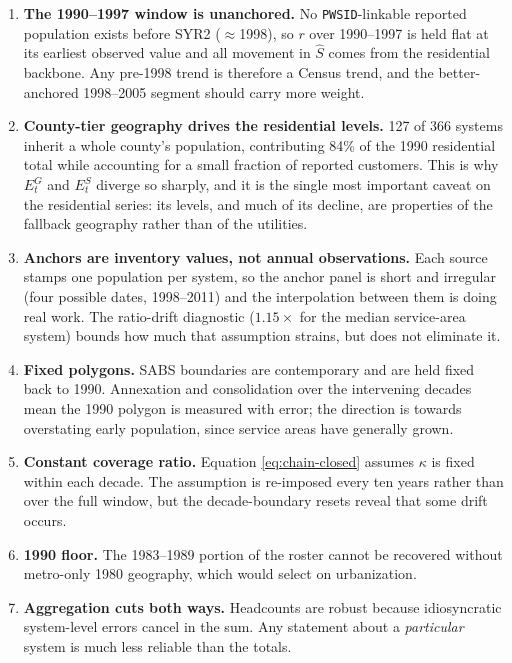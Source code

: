 \begin{enumerate}
  \item \textbf{The 1990--1997 window is unanchored.} No \texttt{PWSID}-linkable
    reported population exists before SYR2 ($\approx$1998), so $r$ over
    1990--1997 is held flat at its earliest observed value and all movement in
    $\hat S$ comes from the residential backbone. Any pre-1998 trend is therefore
    a Census trend, and the better-anchored 1998--2005 segment should carry more
    weight.
  \item \textbf{County-tier geography drives the residential levels.} 127 of 366
    systems inherit a whole county's population, contributing 84\% of the 1990
    residential total while accounting for a small fraction of reported
    customers. This is why $E^{G}_t$ and $E^{S}_t$ diverge so sharply, and it is
    the single most important caveat on the residential series: its levels, and
    much of its decline, are properties of the fallback geography rather than of
    the utilities.
  \item \textbf{Anchors are inventory values, not annual observations.} Each
    source stamps one population per system, so the anchor panel is short and
    irregular (four possible dates, 1998--2011) and the interpolation between
    them is doing real work. The ratio-drift diagnostic ($1.15\times$ for the
    median service-area system) bounds how much that assumption strains, but does
    not eliminate it.
  \item \textbf{Fixed polygons.} SABS boundaries are contemporary and are held
    fixed back to 1990. Annexation and consolidation over the intervening decades
    mean the 1990 polygon is measured with error; the direction is towards
    overstating early population, since service areas have generally grown.
  \item \textbf{Constant coverage ratio.} Equation \eqref{eq:chain-closed} assumes
    $\kappa$ is fixed within each decade. The assumption is re-imposed every ten
    years rather than over the full window, but the decade-boundary resets reveal
    that some drift occurs.
  \item \textbf{1990 floor.} The 1983--1989 portion of the roster cannot be
    recovered without metro-only 1980 geography, which would select on
    urbanization.
  \item \textbf{Aggregation cuts both ways.} Headcounts are robust because
    idiosyncratic system-level errors cancel in the sum. Any statement about a
    \emph{particular} system is much less reliable than the totals.
\end{enumerate}
